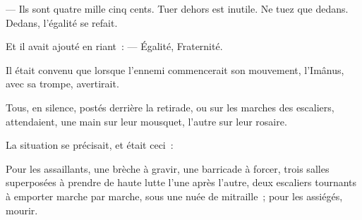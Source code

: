 \documentclass[french,twoside]{book} %
\begin{document}
— Ils sont quatre mille cinq cents. Tuer dehors est inutile. Ne tuez que dedans. Dedans, l’égalité se refait.\par
Et il avait ajouté en riant : — Égalité, Fraternité.\par
Il était convenu que lorsque l’ennemi commencerait son mouvement, l’Imânus, avec sa trompe, avertirait.\par
Tous, en silence, postés derrière la retirade, ou sur les marches des escaliers, attendaient, une main sur leur mousquet, l’autre sur leur rosaire.\par
La situation se précisait, et était ceci :\par
Pour les assaillants, une brèche à gravir, une barricade à forcer, trois salles superposées à prendre de haute lutte l’une après l’autre, deux escaliers tournants à emporter marche par marche, sous une nuée de mitraille ; pour les assiégés, mourir.
\end{document}
